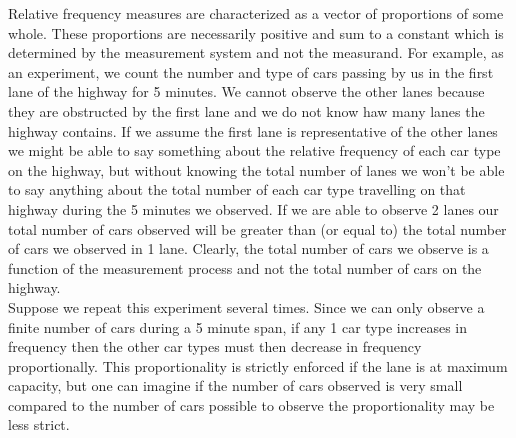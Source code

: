 \documentclass{article}\usepackage[]{graphicx}\usepackage[]{color}
\begin{document}
Relative frequency measures are characterized as a vector of proportions of some whole.  These proportions are necessarily positive and sum to a constant which is determined by the measurement system and not the measurand.  For example, as an experiment, we count the number and type of cars passing by us in the first lane of the highway for 5 minutes.  We cannot observe the other lanes because they are obstructed by the first lane and we do not know haw many lanes the highway contains.  If we assume the first lane is representative of the other lanes we might be able to say something about the relative frequency of each car type on the highway, but without knowing the total number of lanes we won't be able to say anything about the total number of each car type travelling on that highway during the 5 minutes we observed. If we are able to observe 2 lanes our total number of cars observed will be greater than (or equal to) the total number of cars we observed in 1 lane.  Clearly, the total number of cars we observe is a function of the measurement process and not the total number of cars on the highway.\\

Suppose we repeat this experiment several times.  Since we can only observe a finite number of cars during a 5 minute span, if any 1 car type increases in frequency then the other car types must then decrease in frequency proportionally.  This proportionality is strictly enforced if the lane is at maximum capacity, but one can imagine if the number of cars observed is very small compared to the number of cars possible to observe the proportionality may be less strict.  \\


\end{document}
